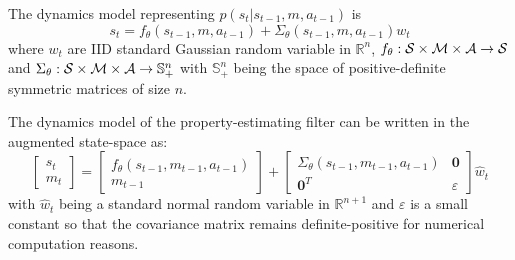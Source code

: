 \documentclass[anon]{l4dc2024}
\begin{document}
The dynamics model representing $p(s_t|s_{t-1}, m, a_{t-1})$ is
\begin{equation}
    s_t = f_{\theta}(s_{t-1}, m, a_{t-1}) + \Sigma_{\theta}(s_{t-1}, m, a_{t-1})w_t
\end{equation}
where $w_t$ are \ac{IID} standard Gaussian random variable in $\mathbb{R}^n$,
$f_\theta: \mathcal{S} \times \mathcal{M} \times \mathcal{A} \rightarrow \mathcal{S}$ and
$\Sigma_\theta: \mathcal{S} \times \mathcal{M} \times \mathcal{A} \rightarrow \mathbb{S}^n_+$ with $\mathbb{S}^n_+$ being the space of positive-definite symmetric matrices of size $n$.

The dynamics model of the property-estimating filter can be written in the augmented state-space as:
\begin{equation}
    \begin{bmatrix}
        s_t \\
        m_t
    \end{bmatrix} =
    \begin{bmatrix}
        f_{\theta}(s_{t-1}, m_{t-1}, a_{t-1}) \\
        m_{t-1}
    \end{bmatrix} +
    \begin{bmatrix}
        \Sigma_{\theta}(s_{t-1}, m_{t-1}, a_{t-1}) & \mathbf{0}  \\
        \mathbf{0}^T                               & \varepsilon
    \end{bmatrix}\hat{w}_t
\end{equation}
with $\hat{w}_t$ being a standard normal random variable in $\mathbb{R}^{n+1}$ and
$\varepsilon$ is a small constant so that the covariance matrix remains definite-positive for numerical computation reasons.
\end{document}
